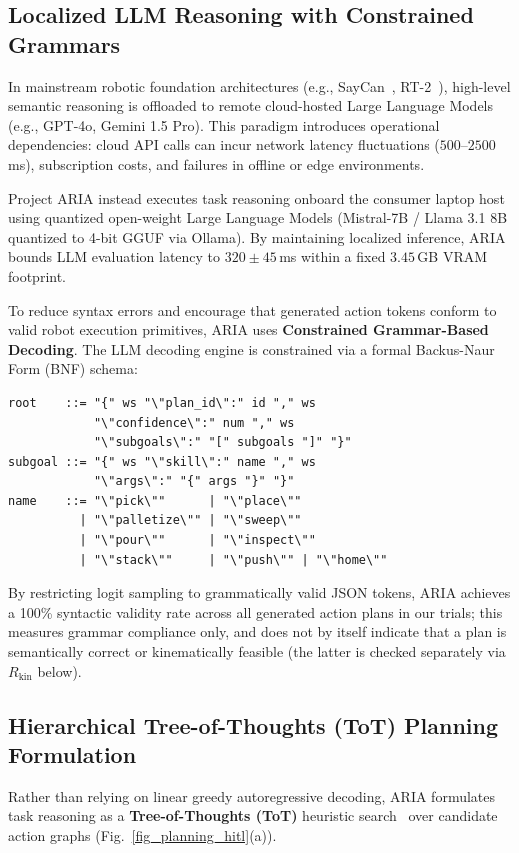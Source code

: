 \documentclass[journal]{IEEEtran}
\begin{document}
\subsection{Localized LLM Reasoning with Constrained Grammars}
In mainstream robotic foundation architectures (e.g., SayCan~\cite{ahn2022can}, RT-2~\cite{zitkovich2023rt2}), high-level semantic reasoning is offloaded to remote cloud-hosted Large Language Models (e.g., GPT-4o, Gemini 1.5 Pro). This paradigm introduces operational dependencies: cloud API calls can incur network latency fluctuations ($500\text{--}2500$\,ms), subscription costs, and failures in offline or edge environments.

Project ARIA instead executes task reasoning onboard the consumer laptop host using quantized open-weight Large Language Models (Mistral-7B / Llama 3.1 8B quantized to 4-bit GGUF via Ollama). By maintaining localized inference, ARIA bounds LLM evaluation latency to $320 \pm 45$\,ms within a fixed $3.45$\,GB VRAM footprint.

To reduce syntax errors and encourage that generated action tokens conform to valid robot execution primitives, ARIA uses \textbf{Constrained Grammar-Based Decoding}. The LLM decoding engine is constrained via a formal Backus-Naur Form (BNF) schema:
{\scriptsize
\begin{verbatim}
root    ::= "{" ws "\"plan_id\":" id "," ws 
            "\"confidence\":" num "," ws 
            "\"subgoals\":" "[" subgoals "]" "}"
subgoal ::= "{" ws "\"skill\":" name "," ws 
            "\"args\":" "{" args "}" "}"
name    ::= "\"pick\""      | "\"place\"" 
          | "\"palletize\"" | "\"sweep\"" 
          | "\"pour\""      | "\"inspect\"" 
          | "\"stack\""     | "\"push\"" | "\"home\""
\end{verbatim}
}
By restricting logit sampling to grammatically valid JSON tokens, ARIA achieves a 100\% syntactic validity rate across all generated action plans in our trials; this measures grammar compliance only, and does not by itself indicate that a plan is semantically correct or kinematically feasible (the latter is checked separately via $R_{\text{kin}}$ below).

\subsection{Hierarchical Tree-of-Thoughts (ToT) Planning Formulation}
Rather than relying on linear greedy autoregressive decoding, ARIA formulates task reasoning as a \textbf{Tree-of-Thoughts (ToT)} heuristic search~\cite{aria_132_yao_2023_tree} over candidate action graphs (Fig.~\ref{fig_planning_hitl}(a)).
\end{document}
